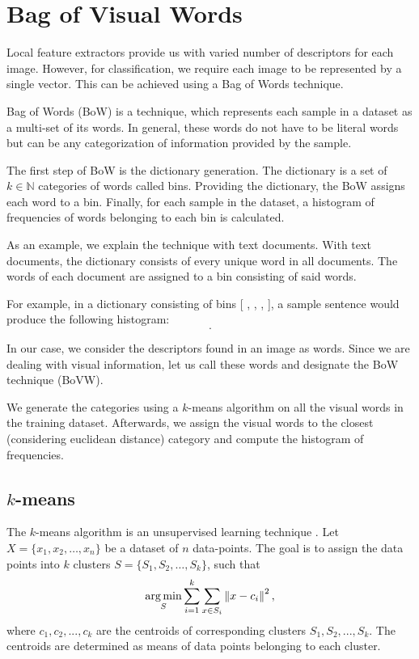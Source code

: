 \section{Bag of Visual Words}
Local feature extractors provide us with varied number of descriptors for each image. However, for classification, we require each image to be represented by a single vector. This can be achieved using a Bag of Words technique.

Bag of Words (BoW) is a technique, which represents each sample in a dataset as a multi-set of its words. In general, these words do not have to be literal words but can be any categorization of information provided by the sample.

The first step of BoW is the dictionary generation. The dictionary is a set of $k \in \mathbb{N}$ categories of words called bins. Providing the dictionary, the BoW assigns each word to a bin. Finally, for each sample in the dataset, a histogram of frequencies of words belonging to each bin is calculated.

As an example, we explain the technique with text documents. With text documents, the dictionary consists of every unique word in all documents. The words of each document are assigned to a bin consisting of said words.

For example, in a dictionary consisting of bins [ , , ,  ], a sample sentence  would produce the following histogram:
\begin{equation}
    [2, 0, 1, 1].
\end{equation}

In our case, we consider the descriptors found in an image as words. Since we are dealing with visual information, let us call these words  and designate the BoW technique  (BoVW).

We generate the categories using a $k$-means algorithm on all the visual words in the training dataset. Afterwards, we assign the visual words to the closest (considering euclidean distance) category and compute the histogram of frequencies.

\subsection{$k$-means}
The $k$-means algorithm is an unsupervised learning technique \cite{macqueen1967}. Let $X=\{ x_1, x_2, \dots, x_n \}$ be a dataset of $n$ data-points. The goal is to assign the data points into $k$ clusters $S = \{ S_1, S_2, \dots, S_k \}$, such that
\begin{equation}
    \operatorname*{arg\,min}_S \sum_{i=1}^k \sum_{x\in S_i} \left\lVert x-c_i\right\rVert^2,
\end{equation}
where \(c_1, c_2, ..., c_k \) are the centroids of corresponding clusters \(S_1, S_2, ..., S_k \). The centroids are determined as means of data points belonging to each cluster.

